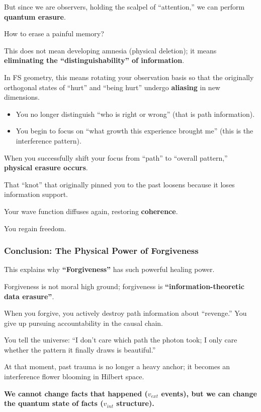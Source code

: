 But since we are observers, holding the scalpel of ``attention,'' we can perform \textbf{quantum erasure}.

How to erase a painful memory?

This does not mean developing amnesia (physical deletion); it means \textbf{eliminating the ``distinguishability'' of information}.

In FS geometry, this means rotating your observation basis so that the originally orthogonal states of ``hurt'' and ``being hurt'' undergo \textbf{aliasing} in new dimensions.

\begin{itemize}
\item You no longer distinguish ``who is right or wrong'' (that is path information).

\item You begin to focus on ``what growth this experience brought me'' (this is the interference pattern).
\end{itemize}

When you successfully shift your focus from ``path'' to ``overall pattern,'' \textbf{physical erasure occurs}.

That ``knot'' that originally pinned you to the past loosens because it loses information support.

Your wave function diffuses again, restoring \textbf{coherence}.

You regain freedom.

\subsubsection{Conclusion: The Physical Power of Forgiveness}

This explains why \textbf{``Forgiveness''} has such powerful healing power.

Forgiveness is not moral high ground; forgiveness is \textbf{``information-theoretic data erasure''}.

When you forgive, you actively destroy path information about ``revenge.'' You give up pursuing accountability in the causal chain.

You tell the universe: ``I don't care which path the photon took; I only care whether the pattern it finally draws is beautiful.''

At that moment, past trauma is no longer a heavy anchor; it becomes an interference flower blooming in Hilbert space.

\textbf{We cannot change facts that happened ($v_{ext}$ events), but we can change the quantum state of facts ($v_{int}$ structure).}

